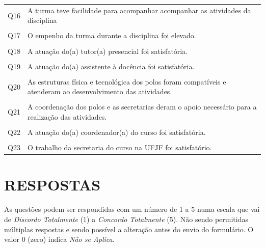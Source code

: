 \documentclass[a4paper,10pt]{article}
\begin{document}
{\begin{center}
\begin{tabularx}{\linewidth}{c|X}
Q16&A turma teve facilidade para acompanhar acompanhar as atividades da disciplina\\\\
Q17&O empenho da turma durante a disciplina foi elevado.\\\\
Q18&A atuação do(a) tutor(a) presencial foi satisfatória.\\\\
Q19&A atuação do(a) assistente à docência foi satisfatória.\\\\
Q20&As estruturas física e tecnológica dos polos foram compatíveis e atenderam ao desenvolvimento das atividades.\\\\
Q21&A coordenação dos polos e as secretarias deram o apoio necessário para a realização das atividades.\\\\
Q22&A atuação do(a) coordenador(a) do curso foi satisfatória.\\\\
Q23&O trabalho da secretaria do curso na UFJF foi satisfatório.
\end{tabularx}
\end{center}
}
\section{RESPOSTAS}
As questões podem ser respondidas com um número de 1 a 5 numa escala que vai de {\it Discordo Totalmente} (1) a {\it Concordo Totalmente} (5). Não sendo permitidas múltiplas respostas e sendo possível a alteração antes do envio do formulário. O valor 0 (zero) indica {\it Não se Aplica}.
\end{document}
